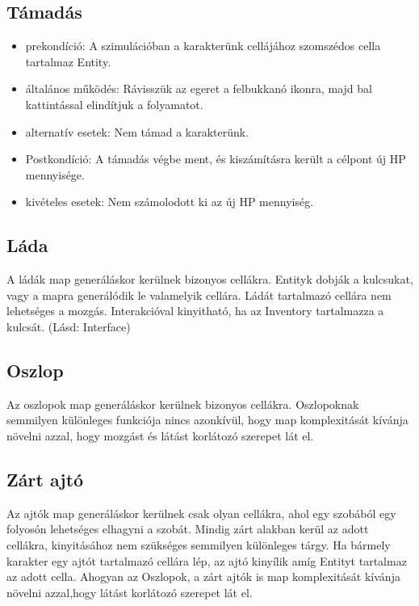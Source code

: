 \subsection{Támadás}

\begin{itemize}
    \item prekondíció: A szimulációban a karakterünk cellájához szomszédos cella tartalmaz Entity.
    \item általános működés: Rávisszük az egeret a felbukkanó ikonra, majd bal kattintással elindítjuk a folyamatot.
    \item alternatív esetek: Nem támad a karakterünk.
    \item Postkondíció: A támadás végbe ment, és kiszámításra került a célpont új HP mennyisége.
    \item kivételes esetek: Nem számolodott ki az új HP mennyiség.
\end{itemize}


\label{object}

\subsection{Láda}

A ládák map generáláskor kerülnek bizonyos cellákra.
Entityk dobják a kulcsukat, vagy a mapra generálódik le valamelyik cellára.
Ládát tartalmazó cellára nem lehetséges a mozgás.
Interakcióval kinyitható, ha az Inventory tartalmazza a kulcsát. (Lásd: Interface)

\subsection{Oszlop}

Az oszlopok map generáláskor kerülnek bizonyos cellákra.
Oszlopoknak semmilyen különleges funkciója nincs azonkívül, hogy map komplexitását kívánja növelni azzal,
hogy mozgást és látást korlátozó szerepet lát el.

\subsection{Zárt ajtó}

Az ajtók map generáláskor kerülnek csak olyan cellákra, ahol egy szobából egy folyosón lehetséges elhagyni a szobát.
Mindig zárt alakban kerül az adott cellákra, kinyitásához nem szükséges semmilyen különleges tárgy. Ha bármely karakter egy ajtót tartalmazó cellára lép, az ajtó kinyílik amíg Entityt tartalmaz az adott cella.
Ahogyan az Oszlopok, a zárt ajtók is map komplexitását kívánja növelni azzal,hogy látást korlátozó szerepet lát el.

